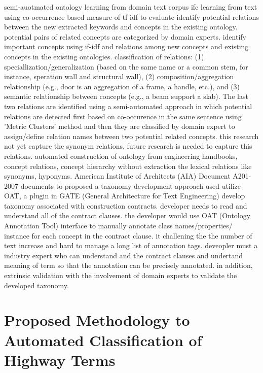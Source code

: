 \documentclass[Journal,InsideFigs, DoubleSpace]{ascelike} %
\begin{document}
%
\cite{rezgui07} semi-auotmated ontology learning from domain text corpus ifc learning from text using co-occurrence based measure of tf-idf to evaluate identify potential relations between the new extracted keywords and concepts in the existing ontology. potential pairs of related concepts are categorized by domain experts. identify important concepts using if-idf and relations among new concepts and existing concepts in the existing ontologies. classification of relations: (1) speciallization/generalization (based on the same name or a common stem, for instance, speration wall and structural wall), (2) composition/aggregation relationship (e.g., door is an aggregation of a frame, a handle, etc.), and (3)  semantic relationship between concepts (e.g., a beam support a slab). The last two relations are identified using a semi-automated approach in which potential relations are detected first based on co-occurence in the same sentence using 'Metric Clusters' method and then they are classified by domain expert to assign/define relation names between two potential related concepts. this research not yet capture the synonym relations, future research is needed to capture this relations. 
\cite{hsieh11} automated construction of ontology from engineering handbooks, concept relations, concept hierarchy without extraction the lexical relations like synonyms, hyponyms.
\cite{niu15} American Institute of Architects (AIA) Document A201-2007 documents to proposed a taxonomy development approach used utilize OAT, a plugin in GATE (General Architecture for Text Engineering) develop taxonomy associated with construction contracts. developer needs to read and understand all of the contract clauses. the developer would use OAT (Ontology Annotation Tool) interface to manually annotate class names/properties/ instance for each concept in the contract clause. it challening the the number of text increase and hard to manage a long list of annotation tags. deveopler must a industry expert who can understand and the contract clauses and undertand meaning of term so that the annotation can be precisely annotated. in addition, extrinsic validation with the involvement of domain experts to validate the developed taxonomy. 
%
%
\section{Proposed Methodology to Automated Classification of Highway Terms} \label{sec:infralex}
\end{document}

